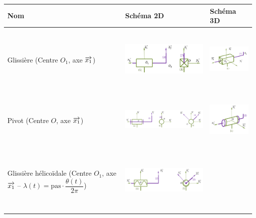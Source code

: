 \documentclass[10pt,oneside]{article}
\begin{document}
\begin{center}
\begin{tabular}{|m{}|p{}|p{}|}
\hline
Nom &  Schéma 2D & Schéma 3D  \\
\hline
Glissière (Centre $O_1$, axe $\overrightarrow{x_1}$)
&
\begin{center}
\includegraphics[height=2.5cm]{png/glissiere_2D}
\end{center}
&
\begin{center}
\includegraphics[height=2cm]{png/glissiere_3D}
\end{center}\\
\hline
Pivot (Centre $O$, axe $\overrightarrow{x_1}$)
&
\begin{center}
\includegraphics[height=2cm]{png/pivot_2d}
\end{center}
&
\begin{center}
\includegraphics[height=2cm]{png/pivot_3d}
\end{center}\\
\hline
Glissière hélicoïdale
(Centre $O_1$, axe $\overrightarrow{x_1}$ -- $\lambda(t)=\text{pas}\cdot \dfrac{\theta(t)}{2\pi}$)
&
\begin{center}
\includegraphics[height=2.5cm]{png/helico_2d}

\end{center}
\end{tabular}
\end{center}
\end{document}
